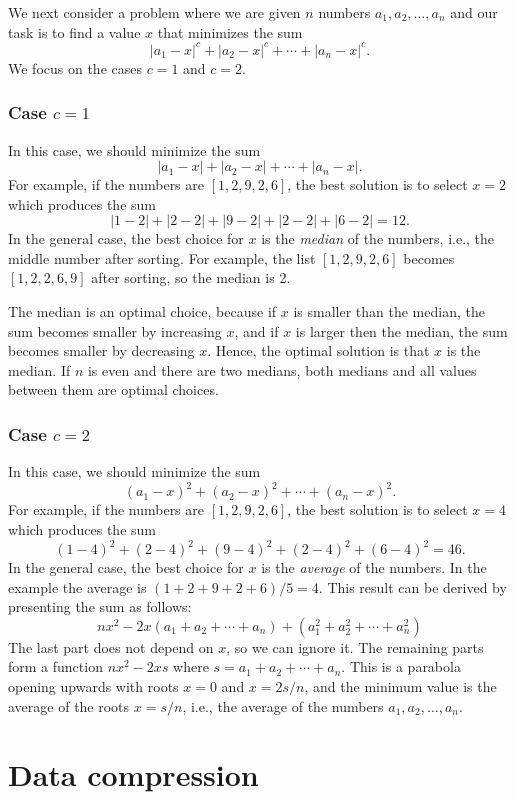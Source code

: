 We next consider a problem where
we are given $n$ numbers $a_1,a_2,\ldots,a_n$
and our task is to find a value $x$
that minimizes the sum
\[|a_1-x|^c+|a_2-x|^c+\cdots+|a_n-x|^c.\]
We focus on the cases $c=1$ and $c=2$.

\subsubsection{Case $c=1$}

In this case, we should minimize the sum
\[|a_1-x|+|a_2-x|+\cdots+|a_n-x|.\]
For example, if the numbers are $[1,2,9,2,6]$,
the best solution is to select $x=2$
which produces the sum
\[
|1-2|+|2-2|+|9-2|+|2-2|+|6-2|=12.
\]
In the general case, the best choice for $x$
is the \textit{median} of the numbers,
i.e., the middle number after sorting.
For example, the list $[1,2,9,2,6]$
becomes $[1,2,2,6,9]$ after sorting,
so the median is 2.

The median is an optimal choice,
because if $x$ is smaller than the median,
the sum becomes smaller by increasing $x$,
and if $x$ is larger then the median,
the sum becomes smaller by decreasing $x$.
Hence, the optimal solution is that $x$
is the median.
If $n$ is even and there are two medians,
both medians and all values between them
are optimal choices.

\subsubsection{Case $c=2$}

In this case, we should minimize the sum
\[(a_1-x)^2+(a_2-x)^2+\cdots+(a_n-x)^2.\]
For example, if the numbers are $[1,2,9,2,6]$,
the best solution is to select $x=4$
which produces the sum
\[
(1-4)^2+(2-4)^2+(9-4)^2+(2-4)^2+(6-4)^2=46.
\]
In the general case, the best choice for $x$
is the \emph{average} of the numbers.
In the example the average is $(1+2+9+2+6)/5=4$.
This result can be derived by presenting
the sum as follows:
\[
nx^2 - 2x(a_1+a_2+\cdots+a_n) + (a_1^2+a_2^2+\cdots+a_n^2)
\]
The last part does not depend on $x$,
so we can ignore it.
The remaining parts form a function
$nx^2-2xs$ where $s=a_1+a_2+\cdots+a_n$.
This is a parabola opening upwards
with roots $x=0$ and $x=2s/n$,
and the minimum value is the average
of the roots $x=s/n$, i.e.,
the average of the numbers $a_1,a_2,\ldots,a_n$.

\section{Data compression}

